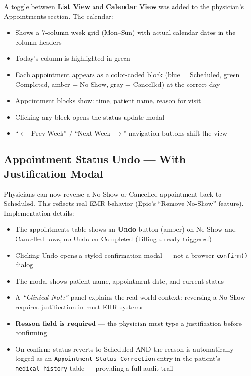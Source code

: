 \documentclass[12pt, letterpaper]{article}
\begin{document}
A toggle between \textbf{List View} and \textbf{Calendar View} was added to the physician's Appointments section. The calendar:
\begin{itemize}
  \item Shows a 7-column week grid (Mon--Sun) with actual calendar dates in the column headers
  \item Today's column is highlighted in green
  \item Each appointment appears as a color-coded block (blue = Scheduled, green = Completed, amber = No-Show, gray = Cancelled) at the correct day
  \item Appointment blocks show: time, patient name, reason for visit
  \item Clicking any block opens the status update modal
  \item ``$\leftarrow$ Prev Week'' / ``Next Week $\rightarrow$'' navigation buttons shift the view
\end{itemize}

\subsection{Appointment Status Undo — With Justification Modal}

Physicians can now reverse a No-Show or Cancelled appointment back to Scheduled. This reflects real EMR behavior (Epic's ``Remove No-Show'' feature). Implementation details:

\begin{itemize}
  \item The appointments table shows an \textbf{Undo} button (amber) on No-Show and Cancelled rows; no Undo on Completed (billing already triggered)
  \item Clicking Undo opens a styled confirmation modal — not a browser \texttt{confirm()} dialog
  \item The modal shows patient name, appointment date, and current status
  \item A \textit{``Clinical Note''} panel explains the real-world context: reversing a No-Show requires justification in most EHR systems
  \item \textbf{Reason field is required} — the physician must type a justification before confirming
  \item On confirm: status reverts to Scheduled AND the reason is automatically logged as an \texttt{Appointment Status Correction} entry in the patient's \texttt{medical\_history} table — providing a full audit trail
\end{itemize}
\end{document}
